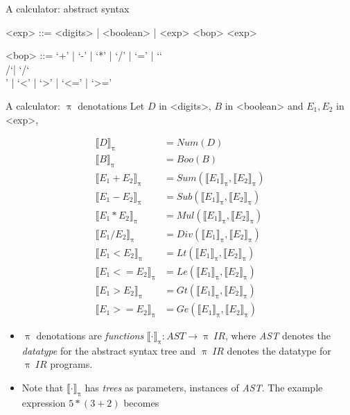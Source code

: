 \documentclass{beamer}
\newcommand{\BS}{\char`\\}
\begin{document}

\begin{frame}[fragile]{A calculator: abstract syntax}
\begin{grammar}
<exp> ::= <digits> | <boolean> | <exp> <bop> <exp> 

<bop> ::= `+' | `-' | `*' | `/' | `=' | `\BS/`| `/\BS' | `<' | `>' | `<=' | `>=' 
\end{grammar}
\end{frame}


\begin{frame}{A calculator: {\color{red}$\uppi$} denotations}
Let $D$ in <digits>, $B$ in <boolean> and $E_1, E_2$ in <exp>,

\begin{footnotesize}
\begin{align}
\label{eq:dig}\llbracket D \rrbracket_{\uppi} & = Num(D) \\
\llbracket B \rrbracket_{\uppi} & = Boo(B) \\
\label{eq:add}\llbracket E_1 + E_2 \rrbracket_{\uppi} & = Sum(\llbracket E_1 \rrbracket_{\uppi}, \llbracket E_2 \rrbracket_{\uppi}) \\
\llbracket E_1 - E_2 \rrbracket_{\uppi} & = Sub(\llbracket E_1 \rrbracket_{\uppi}, \llbracket E_2 \rrbracket_{\uppi}) \\
\label{eq:mul}\llbracket E_1 * E_2 \rrbracket_{\uppi} & = Mul(\llbracket E_1 \rrbracket_{\uppi}, \llbracket E_2 \rrbracket_{\uppi}) \\
\llbracket E_1 / E_2 \rrbracket_{\uppi} & = Div(\llbracket E_1 \rrbracket_{\uppi}, \llbracket E_2 \rrbracket_{\uppi}) \\
\llbracket E_1 < E_2 \rrbracket_{\uppi} & = Lt(\llbracket E_1 \rrbracket_{\uppi}, \llbracket E_2 \rrbracket_{\uppi}) \\
\llbracket E_1 {<=} E_2 \rrbracket_{\uppi} & = Le(\llbracket E_1 \rrbracket_{\uppi}, \llbracket E_2 \rrbracket_{\uppi}) \\
\llbracket E_1 > E_2 \rrbracket_{\uppi} & = Gt(\llbracket E_1 \rrbracket_{\uppi}, \llbracket E_2 \rrbracket_{\uppi}) \\
\llbracket E_1 {>\!=} E_2 \rrbracket_{\uppi} & = Ge(\llbracket E_1 \rrbracket_{\uppi}, \llbracket E_2 \rrbracket_{\uppi}) 
\end{align}
\end{footnotesize}

\framebreak 

\begin{itemize}
\item {\color{red}$\uppi$} denotations are \emph{functions} $\llbracket \cdot \rrbracket_\uppi : \mathit{AST} \to \uppi \ \mathit{IR}$, where 
\emph{AST} denotes the \emph{datatype} for the abstract syntax tree and $\uppi \ \mathit{IR}$ denotes the datatype for {\color{red}$\uppi \ \mathit{IR}$} programs. 
\item Note that $\llbracket \cdot \rrbracket_\uppi$ has \emph{trees} as parameters, instances of \emph{AST}. The example expression $5 * (3 + 2)$ becomes


\end{itemize}
\end{frame}
\end{document}
